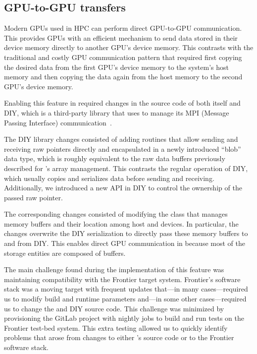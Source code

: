 \subsection{GPU-to-GPU transfers}

Modern GPUs used in HPC can perform direct GPU-to-GPU communication. This provides GPUs with an efficient mechanism to send data stored in their device memory directly to another GPU's device memory. This contrasts with the traditional and costly GPU communication pattern that required first copying the desired data from the first GPU's device memory to the system's host memory and then copying the data again from the host memory to the second GPU's device memory.

Enabling this feature in \vtkm required changes in the source code of both \vtkm itself and DIY, which is a third-party library that \vtkm uses to manage its MPI (Message Passing Interface) communication~\citep{Peterka2011,Morozov2016}.

The DIY library changes consisted of adding routines that allow sending and receiving raw pointers directly and encapsulated in a newly introduced ``blob'' data type, which is roughly equivalent to the raw data buffers previously described for \vtkm's array management.
This contrasts the regular operation of DIY, which usually copies and serializes data before sending and receiving.
Additionally, we introduced a new API in DIY to control the ownership of the passed raw pointer.

The corresponding \vtkm changes consisted of modifying the \vtkm class that manages memory buffers and their location among host and devices.
In particular, the changes overwrite the DIY serialization to directly pass these memory buffers to and from DIY.
This enables direct GPU communication in \vtkm because most of the \vtkm storage entities are composed of \vtkm buffers. 

The main challenge found during the implementation of this feature was maintaining compatibility with the Frontier target system.
Frontier's software stack was a moving target with frequent updates that---in many cases---required us to modify build and runtime parameters and---in some other cases---required us to change the \vtkm and DIY source code.
This challenge was minimized by provisioning the \vtkm GitLab project with nightly jobs to build and run tests on the Frontier test-bed system.
This extra testing allowed us to quickly identify problems that arose from changes to either \vtkm's source code or to the Frontier software stack.

